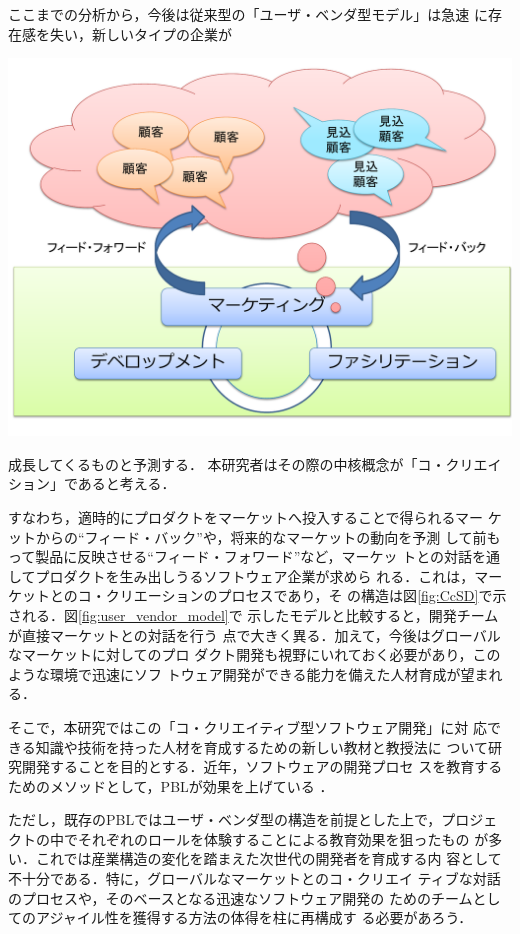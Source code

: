 \documentclass[a4j,twoside]{jarticle}
\begin{document}
\begin{multicols}{2}
    ここまでの分析から，今後は従来型の「ユーザ・ベンダ型モデル」は急速
    に存在感を失い，新しいタイプの企業が
\begin{center}
\includegraphics[width=0.8\linewidth]{figs/CcSD.pdf}
\label{fig:CcSD}
\end{center}
    成長してくるものと予測する．
    本研究者はその際の中核概念が「コ・クリエイション」であると考える．
    
    すなわち，適時的にプロダクトをマーケットへ投入することで得られるマー
    ケットからの``フィード・バック''や，将来的なマーケットの動向を予測
    して前もって製品に反映させる``フィード・フォワード''など，マーケッ
    トとの対話を通してプロダクトを生み出しうるソフトウェア企業が求めら
    れる．これは，マーケットとのコ・クリエーションのプロセスであり，そ
    の構造は図\ref{fig:CcSD}で示される．図\ref{fig:user_vendor_model}で
    示したモデルと比較すると，開発チームが直接マーケットとの対話を行う
    点で大きく異る．加えて，今後はグローバルなマーケットに対してのプロ
    ダクト開発も視野にいれておく必要があり，このような環境で迅速にソフ
    トウェア開発ができる能力を備えた人材育成が望まれる．
    
    そこで，本研究ではこの「コ・クリエイティブ型ソフトウェア開発」に対
    応できる知識や技術を持った人材を育成するための新しい教材と教授法に
    ついて研究開発することを目的とする．近年，ソフトウェアの開発プロセ
    スを教育するためのメソッドとして，PBLが効果を上げている
    \cite{pub:matsuzawa-2008}．

    ただし，既存のPBLではユーザ・ベンダ型の構造を前提とした上で，プロジェ
    クトの中でそれぞれのロールを体験することによる教育効果を狙ったもの
    が多い．これでは産業構造の変化を踏まえた次世代の開発者を育成する内
    容として不十分である．特に，グローバルなマーケットとのコ・クリエイ
    ティブな対話のプロセスや，そのベースとなる迅速なソフトウェア開発の
    ためのチームとしてのアジャイル性を獲得する方法の体得を柱に再構成す
    る必要があろう．
    

\end{multicols}
\end{document}
